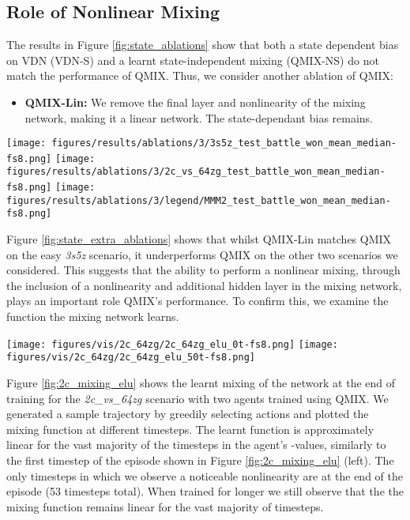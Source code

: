 \documentclass[twoside,11pt]{article}
\begin{document}
\subsection{Role of Nonlinear Mixing}

The results in Figure \ref{fig:state_ablations} show that both a state dependent bias on VDN (VDN-S) and a learnt state-independent mixing (QMIX-NS) do not match the performance of QMIX. 
Thus, we consider another ablation of QMIX:

\begin{itemize}
    \item \textbf{QMIX-Lin:} We remove the final layer and nonlinearity of the mixing network, making it a linear network. The state-dependant bias remains.
\end{itemize}

\begin{figure*}[h!]
    \centering
    \texttt{[image: figures/results/ablations/3/3s5z\_test\_battle\_won\_mean\_median-fs8.png]}
    \texttt{[image: figures/results/ablations/3/2c\_vs\_64zg\_test\_battle\_won\_mean\_median-fs8.png]}
    \texttt{[image: figures/results/ablations/3/legend/MMM2\_test\_battle\_won\_mean\_median-fs8.png]}
    \caption{Ablations for mixing network linearity experiments.}
    \label{fig:state_extra_ablations}
\end{figure*}

Figure \ref{fig:state_extra_ablations} shows that whilst QMIX-Lin matches QMIX 
on the easy \textit{3s5z} scenario, it underperforms QMIX on the other two 
scenarios we considered.
This suggests that the ability to perform a nonlinear mixing, through the inclusion of a nonlinearity and additional hidden layer in the mixing network, plays an important role QMIX's performance.
To confirm this, we examine the function the mixing network learns.

\begin{figure*}[h!]
    \centering
    \texttt{[image: figures/vis/2c\_64zg/2c\_64zg\_elu\_0t-fs8.png]}
    \texttt{[image: figures/vis/2c\_64zg/2c\_64zg\_elu\_50t-fs8.png]}
    \caption{The learnt mixing of QMIX on \textit{2c\_vs\_64zg} at the end of training for timesteps 0 (left) and 50 (right). Circles indicate the -values for the discrete joint-action space.}
    \label{fig:2c_mixing_elu}
\end{figure*}

Figure \ref{fig:2c_mixing_elu} shows the learnt mixing of the network at the end of training for the \textit{2c\_vs\_64zg} scenario with two agents trained using QMIX.
We generated a sample trajectory by greedily selecting actions and plotted the mixing function at different timesteps.
The learnt function is approximately linear for the vast majority of the timesteps 
in the agent's -values, similarly to the first timestep of the episode shown in Figure \ref{fig:2c_mixing_elu} (left).
The only timesteps in which we observe a noticeable
nonlinearity are at the end of the episode (53 timesteps total). 
When trained for longer we still observe that the the mixing function remains linear for the vast majority of timesteps. 
\end{document}
